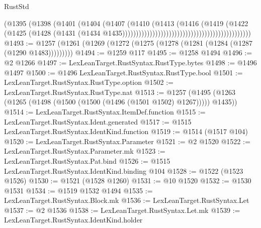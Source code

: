\begin{lexlean}{RustStd}
\begin{coremodule}
                                                                      (@1395
                                                                        (@1398
                                                                          (@1401
                                                                            (@1404
                                                                              (@1407
                                                                                (@1410
                                                                                  (@1413
                                                                                    (@1416
                                                                                      (@1419
                                                                                        (@1422
                                                                                          (@1425
                                                                                            (@1428
                                                                                              (@1431
                                                                                                (@1434
                                                                                                  @1435)))))))))))))))))))))))))))))))))))))))))))))))
@1493 := @1257 (@1261 (@1269 (@1272 (@1275 (@1278 (@1281 (@1284 (@1287 (@1290 @1483)))))))))
@1494 := @1259 @117
@1495 := @1258 @1494
@1496 := @2 @1266
@1497 := LexLeanTarget.RustSyntax.RustType.bytes
@1498 := @1496 @1497
@1500 := @1496 LexLeanTarget.RustSyntax.RustType.bool
@1501 := LexLeanTarget.RustSyntax.RustType.option
@1502 := LexLeanTarget.RustSyntax.RustType.nat
@1513 := @1257 (@1495 (@1263 (@1265 (@1498 (@1500 (@1500 (@1496 (@1501 @1502) @1267))))) @1435))
@1514 := LexLeanTarget.RustSyntax.ItemDef.function
@1515 := LexLeanTarget.RustSyntax.Ident.generated
@1517 := @1515 LexLeanTarget.RustSyntax.IdentKind.function
@1519 := @1514 (@1517 @104)
@1520 := LexLeanTarget.RustSyntax.Parameter
@1521 := @2 @1520
@1522 := LexLeanTarget.RustSyntax.Parameter.mk
@1523 := LexLeanTarget.RustSyntax.Pat.bind
@1526 := @1515 LexLeanTarget.RustSyntax.IdentKind.binding @104
@1528 := @1522 (@1523 @1526)
@1530 := @1521 (@1528 @1260)
@1531 := @10 @1520
@1532 := @1530 @1531
@1534 := @1519 @1532 @1494
@1535 := LexLeanTarget.RustSyntax.Block.mk
@1536 := LexLeanTarget.RustSyntax.Let
@1537 := @2 @1536
@1538 := LexLeanTarget.RustSyntax.Let.mk
@1539 := LexLeanTarget.RustSyntax.IdentKind.holder

\end{coremodule}
\end{lexlean}
